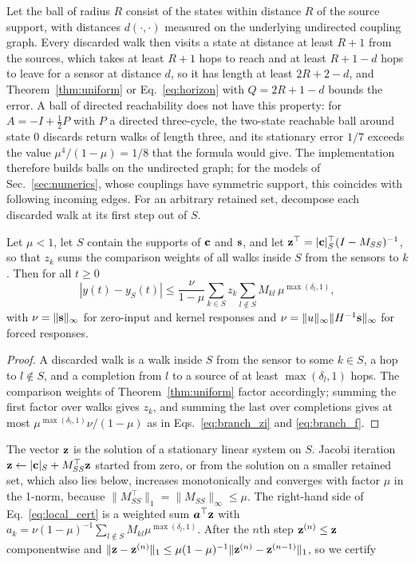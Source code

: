 Let the ball of radius $R$ consist of the states within distance $R$ of the source support, with distances $d(\cdot,\cdot)$ measured on the underlying undirected coupling graph. Every discarded walk then visits a state at distance at least $R+1$ from the sources, which takes at least $R+1$ hops to reach and at least $R+1-d$ hops to leave for a sensor at distance $d$, so it has length at least $2R+2-d$, and Theorem~\ref{thm:uniform} or Eq.~\eqref{eq:horizon} with $Q=2R+1-d$ bounds the error. A ball of directed reachability does not have this property: for $A=-I+\tfrac12P$ with $P$ a directed three-cycle, the two-state reachable ball around state 0 discards return walks of length three, and its stationary error $1/7$ exceeds the value $\mu^4/(1-\mu)=1/8$ that the formula would give. The implementation therefore builds balls on the undirected graph; for the models of Sec.~\ref{sec:numerics}, whose couplings have symmetric support, this coincides with following incoming edges. For an arbitrary retained set, decompose each discarded walk at its first step out of $S$.
\begin{proposition}\label{prop:local}
Let $\mu<1$, let $S$ contain the supports of ${\bf c}$ and ${\bf s}$, and let ${\bf z}^\top=|{\bf c}|_S^\top(I-M_{SS})^{-1}$, so that $z_k$ sums the comparison weights of all walks inside $S$ from the sensors to $k$. Then for all $t\ge0$
\begin{equation}\label{eq:local_cert}
|y(t)-y_S(t)|\le\frac{\nu}{1-\mu}\sum_{k\in S}z_k\sum_{l\notin S}M_{kl}\,\mu^{\max(\delta_l,1)},
\end{equation}
with $\nu=\|{\bf s}\|_\infty$ for zero-input and kernel responses and $\nu=\|u\|_\infty\|H^{-1}{\bf s}\|_\infty$ for forced responses.
\end{proposition}
\begin{proof}
A discarded walk is a walk inside $S$ from the sensor to some $k\in S$, a hop to $l\notin S$, and a completion from $l$ to a source of at least $\max(\delta_l,1)$ hops. The comparison weights of Theorem~\ref{thm:uniform} factor accordingly; summing the first factor over walks gives $z_k$, and summing the last over completions gives at most $\mu^{\max(\delta_l,1)}\nu/(1-\mu)$ as in Eqs.~\eqref{eq:branch_zi} and \eqref{eq:branch_f}.
\end{proof}
The vector ${\bf z}$ is the solution of a stationary linear system on $S$. Jacobi iteration ${\bf z}\leftarrow|{\bf c}|_S+M_{SS}^\top{\bf z}$ started from zero, or from the solution on a smaller retained set, which also lies below, increases monotonically and converges with factor $\mu$ in the 1-norm, because $\|M_{SS}^\top\|_1=\|M_{SS}\|_\infty\le\mu$. The right-hand side of Eq.~\eqref{eq:local_cert} is a weighted sum $\bm{a}^\top{\bf z}$ with $a_k=\nu(1-\mu)^{-1}\sum_{l\notin S}M_{kl}\mu^{\max(\delta_l,1)}$. After the $n$th step ${\bf z}^{(n)}\le{\bf z}$ componentwise and $\|{\bf z}-{\bf z}^{(n)}\|_1\le\mu(1-\mu)^{-1}\|{\bf z}^{(n)}-{\bf z}^{(n-1)}\|_1$, so we certify
